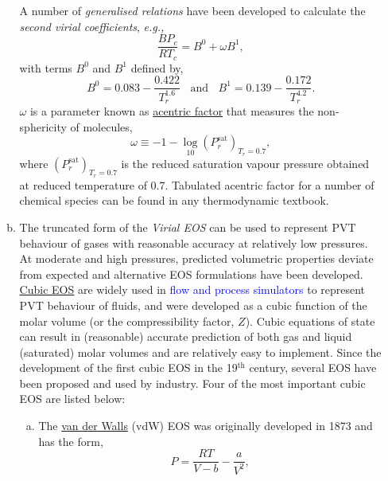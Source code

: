 \documentclass[12pts,a4paper,amsmath,amssymb,floatfix]{article}%
\newcommand{\frc}{\displaystyle\frac}
\newcommand{\blue}{\textcolor{blue}}
\newcommand{\eg}{{\it e.g., }}
\begin{document}
\begin{enumerate}[i)]
\begin{enumerate}[a)]
                   A number of {\it generalised relations} have been developed to calculate the {\it second virial coefficients}, \eg
                   \begin{displaymath}
                      \frc{B P_{c}}{R T_{c}} = B^{0} + \omega B^{1},
                   \end{displaymath}
                   with terms $B^{0}$ and $B^{1}$ defined by,
                   \begin{displaymath}
                      B^{0} = 0.083 - \frc{0.422}{T_{r}^{1.6}}\;\;\text{ and }\;\; B^{1} = 0.139 - \frc{0.172}{T_{r}^{4.2}}.
                   \end{displaymath}
                   $\omega$ is a parameter known as \underline{acentric factor} that measures the non-sphericity of molecules,
                   \begin{displaymath}
                      \omega \equiv -1 - \log\limits_{10}{\left(P_{r}^{\text{sat}}\right)_{T_{r}=0.7}},
                   \end{displaymath}
                   where $\left(P_{r}^{\text{sat}}\right)_{T_{r}=0.7}$ is the reduced saturation vapour pressure obtained at reduced temperature of 0.7. Tabulated acentric factor for a number of chemical species can be found in any thermodynamic textbook.
%
                \item The truncated form of the {\it Virial EOS} can be used to represent PVT behaviour of gases with reasonable accuracy at relatively low pressures. At moderate and high pressures, predicted volumetric properties deviate from expected and alternative EOS formulations have been developed. \underline{Cubic EOS} are widely used in \blue{flow and process simulators} to represent PVT behaviour of fluids, and were developed as a cubic function of the molar volume (or the compressibility factor, $Z$). Cubic equations of state can result in (reasonable) accurate prediction of both gas and liquid (saturated) molar volumes and are relatively easy to implement. Since the development of the first cubic EOS in the 19$^{\text{th}}$ century, several EOS have been proposed and used by industry. Four of the most important cubic EOS are listed below:
                   \begin{enumerate}[c.1)]
%
                      \item The \underline{van der Walls} (vdW) EOS was originally developed in 1873 and has the form,
                          \begin{equation}
                             P = \frc{R T}{V-b} - \frc{a}{V^{2}},\label{Mod02_vdWEOS}

\end{equation}
\end{enumerate}
\end{enumerate}
\end{enumerate}
\end{document}
